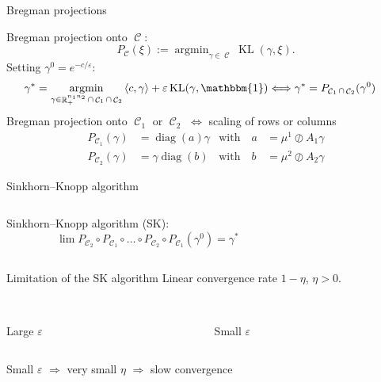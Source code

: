 \documentclass[compress]{beamer}
\newcommand{\scal}[2]{\left\langle #1 , #2 \right\rangle}
\DeclareMathOperator{\IR}{\mathbb{R}}
\DeclareMathOperator*{\argmin}{argmin}
\DeclareMathOperator{\One}{\mathbbm{1}}
\DeclareMathOperator{\Ccal}{\mathcal{C}}
\DeclareMathOperator{\diag}{diag}
\DeclareMathOperator{\KL}{KL}
\renewcommand{\epsilon}{\varepsilon}
\begin{document}
\begin{frame}{Bregman projections}
	
Bregman projection onto $\Ccal$:
\[
P_{\Ccal}(\xi) := \argmin_{\gamma \in \Ccal} \KL(\gamma,\xi).
\]
\pause
Setting $\gamma^0 = e^{-c/\epsilon}$:
\begin{align*}
\gamma^* = \argmin_{\gamma \in \IR^{n_1 n_2}_+ \cap \Ccal_1 \cap \Ccal_2}
	\scal{c}{\gamma} + \epsilon \KL(\gamma,\One)
\Longleftrightarrow
\gamma^* &= P_{\Ccal_1 \cap \Ccal_2}(\gamma^0)
\end{align*}
\pause
Bregman projection onto $\Ccal_1$ or $\Ccal_2$ $\Longleftrightarrow$ scaling of rows or columns
\begin{align*}\label{scaling}
P_{\Ccal_1}(\gamma) &= \diag(a) \gamma &\text{with}\quad
a &=  {\mu^1}\oslash{A_1 \gamma} \\
P_{\Ccal_2}(\gamma) &= \gamma \diag(b) &\text{with}\quad
b &= {\mu^2}\oslash{A_2 \gamma}\nonumber
\end{align*}

\end{frame}

\begin{frame}{Sinkhorn--Knopp algorithm}
	
	\begin{columns}
	\begin{column}{0.6\textwidth}

	Sinkhorn--Knopp algorithm (SK):
	\[
	\lim P_{\Ccal_2}\circ P_{\Ccal_1} \circ \ldots \circ P_{\Ccal_2} \circ P_{\Ccal_1} (\gamma^0) = \gamma^*
	\]
	
\end{column}

\begin{column}{0.4\textwidth}
	\centering
	
\end{column}
\end{columns}
\end{frame}

\begin{frame}{Limitation of the SK algorithm}
Linear convergence rate $1-\eta$, $\eta > 0$.

\begin{columns}
	\begin{column}{0.5\textwidth}
		\centering
		\\
		Large $\epsilon$
	\end{column}
	\begin{column}{0.5\textwidth}
		\centering
		\\
		Small $\epsilon$
	\end{column}
\end{columns}

Small $\epsilon$ $\Longrightarrow$
very small $\eta$ $\Longrightarrow$
slow convergence
\end{frame}
\end{document}
